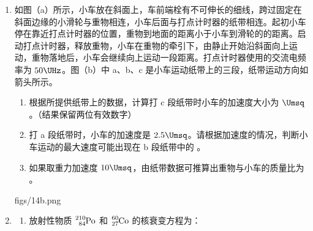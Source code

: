 \documentclass[\gkver]{gaokaozhenti}
\begin{document}
\begin{enumerate}

\item
如图（a）所示，小车放在斜面上，车前端栓有不可伸长的细线，跨过固定在斜面边缘的小滑轮与重物相连，小车后面与打点计时器的纸带相连。起初小车停在靠近打点计时器的位置，重物到地面的距离小于小车到滑轮的的距离。启动打点计时器，释放重物，小车在重物的牵引下，由静止开始沿斜面向上运动，重物落地后，小车会继续向上运动一段距离。打点计时器使用的交流电频率为 $50\UHz$。图（b）中 a、b、c 是小车运动纸带上的三段，纸带运动方向如箭头所示。

\begin{enumerate}
	\item
	根据所提供纸带上的数据，计算打 c 段纸带时小车的加速度大小为 $\Umsq$。（结果保留两位有效数字）

	\item
	打 a 段纸带时，小车的加速度是 $2.5\Umsq$。请根据加速度的情况，判断小车运动的最大速度可能出现在 b 段纸带中的 。

	\item
	如果取重力加速度 $10\Umsq$，由纸带数据可推算出重物与小车的质量比为 。

\end{enumerate}

{figs/14b.png}



\item
\begin{enumerate}
	\item
	放射性物质 $\ce{^{210}_{84}Po}$ 和 $\ce{^{60}_{27}Co}$ 的核衰变方程为：


\end{enumerate}
\end{enumerate}
\end{document}
